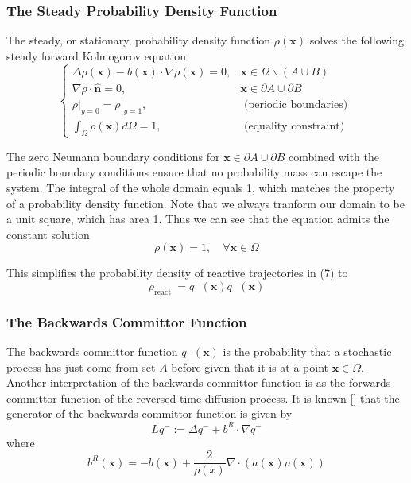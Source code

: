 \documentclass{article}
\begin{document}
\subsubsection{The Steady Probability Density Function}

The steady, or stationary, probability density function $\rho(\boldsymbol{x})$ solves the following steady forward Kolmogorov equation
$$
\begin{cases}\Delta \rho(\boldsymbol{x})-b(\boldsymbol{x}) \cdot \nabla \rho(\boldsymbol{x})=0, & \boldsymbol{x} \in \Omega \backslash(A \cup B) \\ \nabla \rho \cdot \hat{\boldsymbol{n}}=0, & \boldsymbol{x} \in \partial A \cup \partial B \\ \left.\rho\right|_{y=0}=\left.\rho\right|_{y=1}, & \text { (periodic boundaries) } \\ \int_{\Omega} \rho(\boldsymbol{x}) d \Omega=1, & \text { (equality constraint) }\end{cases}
$$

The zero Neumann boundary conditions for $\boldsymbol{x} \in \partial A \cup \partial B$ combined with the periodic boundary conditions ensure that no probability mass can escape the system. The integral of the whole domain equals 1, which matches the property of a probability density function. Note that we always tranform our domain to be a unit square, which has area 1. Thus we can see that the equation admits the constant solution
$$
\rho(\boldsymbol{x})=1, \quad \forall \boldsymbol{x} \in \Omega
$$

This simplifies the probability density of reactive trajectories in (7) to
$$
\rho_{\text {react }}=q^{-}(\boldsymbol{x}) q^{+}(\boldsymbol{x})
$$

\subsubsection{The Backwards Committor Function}

The backwards committor function $q^{-}(\boldsymbol{x})$ is the probability that a stochastic process has just come from set $A$ before given that it is at a point $\boldsymbol{x} \in \Omega$. Another interpretation of the backwards
committor function is as the forwards committor function of the reversed time diffusion process. It is known [] that the generator of the backwards committor function is given by
$$
\bar{L} q^{-}:=\Delta q^{-}+b^{R} \cdot \nabla q^{-}
$$
where
$$
b^{R}(\boldsymbol{x})=-b(\boldsymbol{x})+\frac{2}{\rho(x)} \nabla \cdot(a(\boldsymbol{x}) \rho(\boldsymbol{x}))
$$
\end{document}
